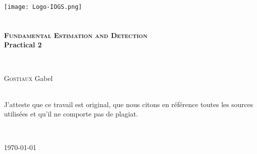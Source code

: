 \begin{titlepage}
\begin{center}

\texttt{[image: Logo-IOGS.png]}~\\[1.5cm]


\textsc{\Large }\\[0.5cm]

\HRule \\[0.4cm]

{\bfseries
\huge \textsc{Fundamental Estimation and Detection}\\[0.5cm]
\Large  Practical 2}

\HRule \\[1cm]

\begin{minipage}{0.8\textwidth}
\begin{flushleft} \large
\textsc{Gostiaux} Gabel \\[1cm]
\end{flushleft}
\end{minipage}


\textsc{\Large }\\[1cm]
J'atteste que ce travail est original, que nous citons en référence toutes les sources utilisées et qu’il ne comporte pas de plagiat.

\textsc{\Large }\\[1cm]




\vfill

{\large \today}

\end{center}
\end{titlepage}